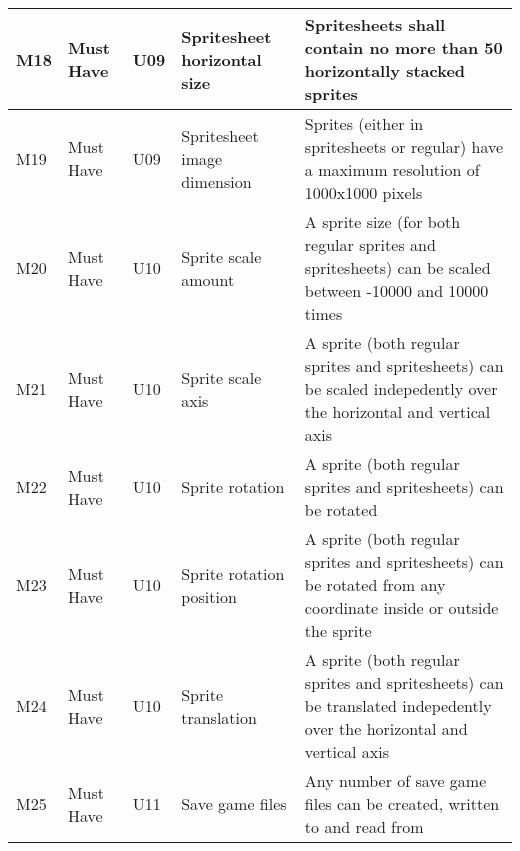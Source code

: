 \documentclass{article} %
\begin{document}
\begin{longtable}{|p{}|p{}|p{}|p{}|p{}|}
    M18                         & Must Have                          & U09                & Spritesheet horizontal size & Spritesheets shall contain no more than 50 horizontally stacked sprites                                                                                     \\ \hline
    M19                         & Must Have                          & U09                & Spritesheet image dimension & Sprites (either in spritesheets or regular) have a maximum resolution of 1000x1000 pixels                                                                   \\ \hline
    M20                         & Must Have                          & U10                & Sprite scale amount         & A sprite size (for both regular sprites and spritesheets) can be scaled between -10000 and 10000 times                                                      \\ \hline
    M21                         & Must Have                          & U10                & Sprite scale axis           & A sprite (both regular sprites and spritesheets) can be scaled indepedently over the horizontal and vertical axis                                           \\ \hline
    M22                         & Must Have                          & U10                & Sprite rotation             & A sprite (both regular sprites and spritesheets) can be rotated                                                                                             \\ \hline
    M23                         & Must Have                          & U10                & Sprite rotation position    & A sprite (both regular sprites and spritesheets) can be rotated from any coordinate inside or outside the sprite                                            \\ \hline
    M24                         & Must Have                          & U10                & Sprite translation          & A sprite (both regular sprites and spritesheets) can be translated indepedently over the horizontal and vertical axis                                       \\ \hline
    M25                         & Must Have                          & U11                & Save game files             & Any number of save game files can be created, written to and read from                                                                                      \\ \hline

\end{longtable}
\end{document}
